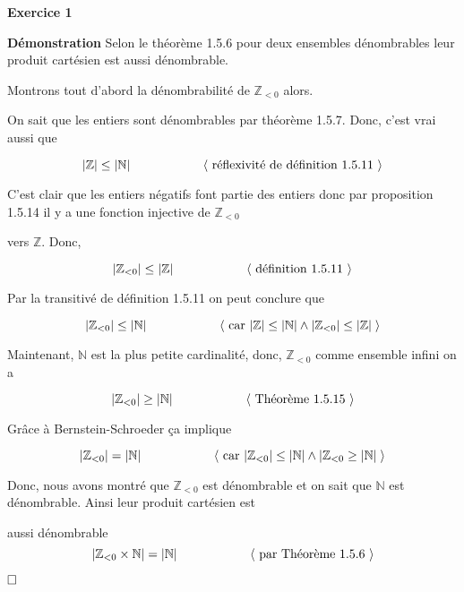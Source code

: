 \documentclass{article}
\newcommand{\tuple}[1]{\ensuremath{\left\langle #1 \right\rangle}}
\begin{document}
    
\textbf{Exercice 1}

\vspace{0.5cm}

\textbf{Démonstration} Selon le théorème 1.5.6 pour deux ensembles dénombrables leur produit cartésien est aussi dénombrable.

Montrons tout d'abord la dénombrabilité de $\mathbb{Z}_{< 0}$ alors.

On sait que les entiers sont dénombrables par théorème 1.5.7. Donc, c'est vrai aussi que

$$|\mathbb{Z}| \leq |\mathbb{N}| \hspace{2 cm}
\tuple{ \text{ réflexivité de définition 1.5.11 } } $$


C’est clair que les entiers négatifs font partie des entiers donc par proposition 1.5.14 il y a une fonction injective de $\mathbb{Z}_{< 0}$ 

vers $\mathbb{Z}$. Donc,

$$
|\mathbb{Z}_{< 0}| \leq |\mathbb{Z}| \hspace{2 cm}
\tuple{ \text{ définition 1.5.11 } }
$$


Par la transitivé de définition 1.5.11 on peut conclure que

$$
|\mathbb{Z}_{< 0}| \leq |\mathbb{N}| \hspace{2 cm}
\tuple{ \text{ car } |\mathbb{Z}| \leq |\mathbb{N}| \land  |\mathbb{Z}_{< 0}| \leq |\mathbb{Z}| \hspace{.1cm} }
$$


Maintenant, $\mathbb{N}$ est la plus petite cardinalité, donc, $\mathbb{Z}_{< 0}$ comme ensemble infini on a

$$
|\mathbb{Z}_{< 0}| \geq |\mathbb{N}| \hspace{2 cm}
\tuple{ \text{ Théorème 1.5.15 } }
$$

Grâce à Bernstein-Schroeder ça implique

$$
|\mathbb{Z}_{< 0}| = |\mathbb{N}| \hspace{2 cm}
\tuple{\text{ car } |\mathbb{Z}_{<0}| \leq |\mathbb{N}| \land  |\mathbb{Z}_{<0} \geq |\mathbb{N}| \hspace{.1cm} }
$$

Donc, nous avons montré que $\mathbb{Z}_{< 0}$ est dénombrable et on sait que $\mathbb{N}$ est dénombrable. Ainsi leur produit cartésien est 

aussi dénombrable
$$
|\mathbb{Z}_{<0} \times \mathbb{N}| = |\mathbb{N}| \hspace{2 cm}
\tuple{ \text{ par Théorème 1.5.6 } }
$$

$\hfill \square$
\end{document}
